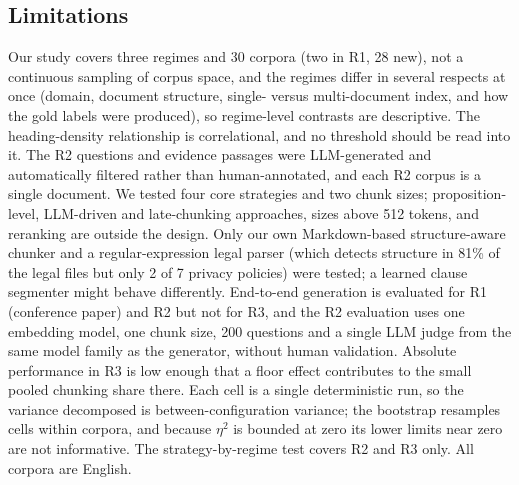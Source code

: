 \documentclass[runningheads]{llncs}
\begin{document}
\subsection{Limitations}
Our study covers three regimes and 30 corpora (two in R1, 28 new), not a continuous sampling of corpus space, and the regimes differ in several respects at once (domain, document structure, single- versus multi-document index, and how the gold labels were produced), so regime-level contrasts are descriptive. The heading-density relationship is correlational, and no threshold should be read into it. The R2 questions and evidence passages were LLM-generated and automatically filtered rather than human-annotated, and each R2 corpus is a single document. We tested four core strategies and two chunk sizes; proposition-level, LLM-driven and late-chunking approaches, sizes above 512 tokens, and reranking are outside the design. Only our own Markdown-based structure-aware chunker and a regular-expression legal parser (which detects structure in 81\% of the legal files but only 2 of 7 privacy policies) were tested; a learned clause segmenter might behave differently. End-to-end generation is evaluated for R1 (conference paper) and R2 but not for R3, and the R2 evaluation uses one embedding model, one chunk size, 200 questions and a single LLM judge from the same model family as the generator, without human validation. Absolute performance in R3 is low enough that a floor effect contributes to the small pooled chunking share there. Each cell is a single deterministic run, so the variance decomposed is between-configuration variance; the bootstrap resamples cells within corpora, and because $\eta^2$ is bounded at zero its lower limits near zero are not informative. The strategy-by-regime test covers R2 and R3 only. All corpora are English.
\end{document}
